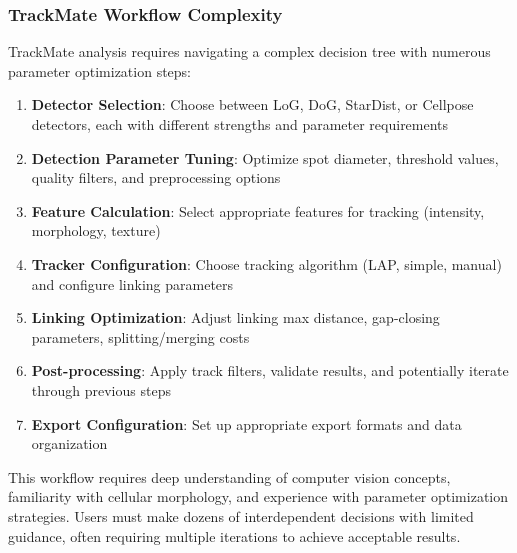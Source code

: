 \documentclass[12pt]{article}
\begin{document}



\subsubsection{TrackMate Workflow Complexity}

TrackMate analysis requires navigating a complex decision tree with numerous parameter optimization steps:

\begin{enumerate}
  \item \textbf{Detector Selection}: Choose between LoG, DoG, StarDist, or Cellpose detectors, each with different strengths and parameter requirements
  \item \textbf{Detection Parameter Tuning}: Optimize spot diameter, threshold values, quality filters, and preprocessing options
  \item \textbf{Feature Calculation}: Select appropriate features for tracking (intensity, morphology, texture)
  \item \textbf{Tracker Configuration}: Choose tracking algorithm (LAP, simple, manual) and configure linking parameters
  \item \textbf{Linking Optimization}: Adjust linking max distance, gap-closing parameters, splitting/merging costs
  \item \textbf{Post-processing}: Apply track filters, validate results, and potentially iterate through previous steps
  \item \textbf{Export Configuration}: Set up appropriate export formats and data organization
\end{enumerate}

This workflow requires deep understanding of computer vision concepts, familiarity with cellular morphology, and experience with parameter optimization strategies. Users must make dozens of interdependent decisions with limited guidance, often requiring multiple iterations to achieve acceptable results.
\end{document}
